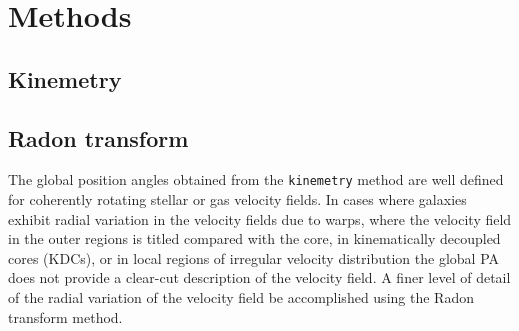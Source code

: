 \section{Methods}
\label{methods}

\subsection{Kinemetry}





\subsection{Radon transform}

The global position angles obtained from the \texttt{kinemetry} method are well defined for coherently rotating stellar or gas velocity fields. In cases where galaxies exhibit radial variation in the velocity fields due to warps, where the velocity field in the outer regions is titled compared with the core, in kinematically decoupled cores (KDCs), or in local regions of irregular velocity distribution the global PA does not provide a clear-cut description of the velocity field. A finer level of detail of the radial variation of the velocity field be accomplished using the Radon transform method. 
